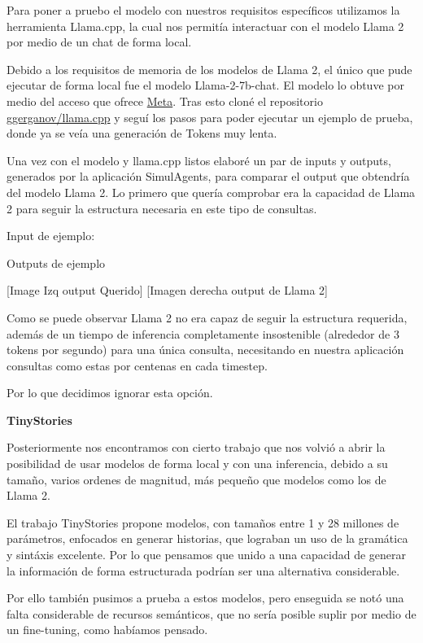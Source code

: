 Para poner a pruebo el modelo con nuestros requisitos específicos utilizamos la herramienta Llama.cpp, la cual nos permitía interactuar con el modelo Llama 2 por medio de un chat de forma local.

Debido a los requisitos de memoria de los modelos de Llama 2, el único que pude ejecutar de forma local fue el modelo Llama-2-7b-chat. El modelo lo obtuve por medio del acceso que ofrece \href{https://llama.meta.com/llama-downloads/}{Meta}. Tras esto cloné el repositorio \href{https://github.com/ggerganov/llama.cpp}{ggerganov/llama.cpp} y seguí los pasos para poder ejecutar un ejemplo de prueba, donde ya se veía una generación de Tokens muy lenta.

Una vez con el modelo y llama.cpp listos elaboré un par de inputs y outputs, generados por la aplicación SimulAgents, para comparar el output que obtendría del modelo Llama 2. Lo primero que quería comprobar era la capacidad de Llama 2 para seguir la estructura necesaria en este tipo de consultas.

Input de ejemplo:

Outputs de ejemplo

[Image Izq output Querido] [Imagen derecha output de Llama 2]

Como se puede observar Llama 2 no era capaz de seguir la estructura requerida, además de un tiempo de inferencia completamente insostenible (alrededor de 3 tokens por segundo) para una única consulta, necesitando en nuestra aplicación consultas como estas por centenas en cada timestep.

Por lo que decidimos ignorar esta opción.

\textbf{TinyStories}

Posteriormente nos encontramos con cierto trabajo que nos volvió a abrir la posibilidad de usar modelos de forma local y con una inferencia, debido a su tamaño, varios ordenes de magnitud, más pequeño que modelos como los de Llama 2.

El trabajo TinyStories \cite{eldan2023tinystories} propone modelos, con tamaños entre 1 y 28 millones de parámetros, enfocados en generar historias, que lograban un uso de la gramática y sintáxis excelente. Por lo que pensamos que unido a una capacidad de generar la información de forma estructurada podrían ser una alternativa considerable.

Por ello también pusimos a prueba a estos modelos, pero enseguida se notó una falta considerable de recursos semánticos, que no sería posible suplir por medio de un fine-tuning, como habíamos pensado.

